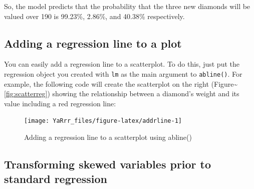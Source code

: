 \documentclass[]{book}
\newenvironment{Shaded}{\begin{snugshade}}{\end{snugshade}}
\newcommand{\KeywordTok}[1]{\textcolor[rgb]{0.13,0.29,0.53}{\textbf{#1}}}
\newcommand{\DataTypeTok}[1]{\textcolor[rgb]{0.13,0.29,0.53}{#1}}
\newcommand{\DecValTok}[1]{\textcolor[rgb]{0.00,0.00,0.81}{#1}}
\newcommand{\StringTok}[1]{\textcolor[rgb]{0.31,0.60,0.02}{#1}}
\newcommand{\CommentTok}[1]{\textcolor[rgb]{0.56,0.35,0.01}{\textit{#1}}}
\newcommand{\OperatorTok}[1]{\textcolor[rgb]{0.81,0.36,0.00}{\textbf{#1}}}
\newcommand{\NormalTok}[1]{#1}
\theoremstyle{definition}
\theoremstyle{definition}
\theoremstyle{remark}
\begin{document}
So, the model predicts that the probability that the three new diamonds
will be valued over 190 is 99.23\%, 2.86\%, and 40.38\% respectively.

\subsection{Adding a regression line to a
plot}\label{adding-a-regression-line-to-a-plot}

You can easily add a regression line to a scatterplot. To do this, just
put the regression object you created with \texttt{lm} as the main
argument to \texttt{abline()}. For example, the following code will
create the scatterplot on the right
(Figure\textasciitilde{}\ref{fig:scatterreg}) showing the relationship
between a diamond's weight and its value including a red regression
line:

\begin{Shaded}
\end{Shaded}

\begin{figure}

{\centering \texttt{[image: YaRrr\_files/figure-latex/addrline-1]} 

}

\caption{Adding a regression line to a scatterplot using abline()}\label{fig:addrline}
\end{figure}

\subsection{Transforming skewed variables prior to standard
regression}\label{transforming-skewed-variables-prior-to-standard-regression}
\end{document}
